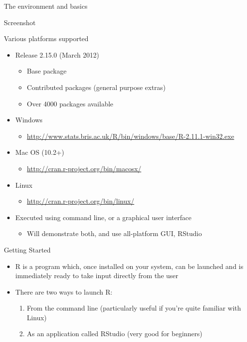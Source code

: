 \documentclass{beamer}
\begin{document}
\begin{frame}{The environment and basics}
\end{frame}

\begin{frame}{Screenshot}
\end{frame}


\begin{frame}{Various platforms supported}
    \begin{itemize}
        \item Release 2.15.0 (March 2012)
        \begin{itemize}
            \item Base package
            \item Contributed packages (general purpose extras)
            \item  Over 4000 packages available
        \end{itemize}
        \item Windows
        \begin{itemize}
            \item \url{http://www.stats.bris.ac.uk/R/bin/windows/base/R-2.11.1-win32.exe}
        \end{itemize}
        \item Mac OS (10.2+)
            \begin{itemize}
                \item \url{http://cran.r-project.org/bin/macosx/}
            \end{itemize}
        \item Linux
            \begin{itemize}
                \item \url{http://cran.r-project.org/bin/linux/}
            \end{itemize}
        \item Executed using command line, or a graphical user interface
        \begin{itemize}
            \item Will demonstrate both, and use all-platform GUI, RStudio
        \end{itemize}
    \end{itemize}
\end{frame}

\begin{frame}{Getting Started}
    \begin{itemize}
        \item R is a program which, once installed on your system, can be launched and is immediately ready to take input directly from the user
        \item There are two ways to launch R:
        \begin{enumerate}
            \item From the command line (particularly useful if you're quite familiar with Linux)
            \item As an application called RStudio (very good for beginners)
        \end{enumerate}
    \end{itemize}
\end{frame}
\end{document}
